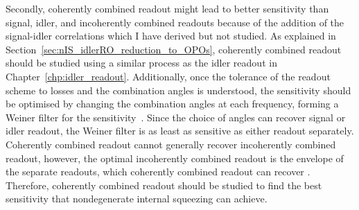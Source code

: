 Secondly, coherently combined readout might lead to better sensitivity than signal, idler, and incoherently combined readouts because of the addition of the signal-idler correlations which I have derived but not studied. As explained in Section~\ref{sec:nIS_idlerRO_reduction_to_OPOs}, coherently combined readout should be studied using a similar process as the idler readout in Chapter~\ref{chp:idler_readout}. Additionally, once the tolerance of the readout scheme to losses and the combination angles is understood, the sensitivity should be optimised by changing the combination angles at each frequency, forming a Weiner filter for the sensitivity~\cite{}. Since the choice of angles can recover signal or idler readout, the Weiner filter is as least as sensitive as either readout separately. Coherently combined readout cannot generally recover incoherently combined readout, however, the optimal incoherently combined readout is the envelope of the separate readouts, which coherently combined readout can recover . Therefore, coherently combined readout should be studied to find the best sensitivity that nondegenerate internal squeezing can achieve.

